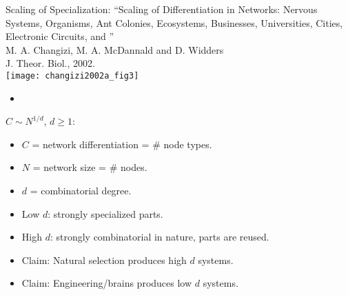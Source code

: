 \begin{frame}

  \begin{block}{Scaling of Specialization:}
    ``Scaling of Differentiation in Networks: Nervous Systems, Organisms,
    Ant Colonies, Ecosystems, Businesses, Universities, Cities, Electronic
    Circuits, and ''\\
    M. A. Changizi, M. A. McDannald and D. Widders\cite{changizi2002a}\\
    J. Theor. Biol., 2002.\\
    \texttt{[image: changizi2002a\_fig3]}
    \begin{itemize}
    \item 
    \end{itemize}


  \end{block}

\end{frame}

\begin{frame}

  \begin{block}{$C \sim N^{1/d}$, $d \ge 1$:}
    \begin{itemize}
    \item 
      $C$ = network differentiation = \# node types.
    \item 
      $N$ = network size = \# nodes.
    \item<+->
      $d$ = combinatorial degree.
    \item<+->
      Low $d$: strongly specialized parts.
    \item<+->
      High $d$: strongly combinatorial in nature, parts are reused. 
    \item<+->
      Claim: Natural selection produces high $d$ systems.
    \item<+->
      Claim: Engineering/brains produces low $d$ systems.
    \end{itemize}

  \end{block}

\end{frame}

